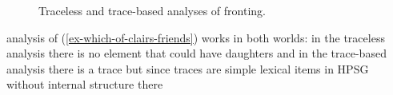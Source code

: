 \documentclass[output=paper
 	        ,biblatex
                ,babelshorthands
                ,newtxmath
                ,draftmode
                ,colorlinks, citecolor=brown
]{langscibook}
\begin{document}
\begin{figure}
\hfill
{}
\hfill
{}
\hfill{}
\caption{Traceless and trace-based analyses of fronting.}\label{fig-trace-based-and-traceless}
\end{figure}
 analysis of (\ref{ex-which-of-clairs-friends}) works in both worlds: in the
traceless analysis there is no element that could have daughters and in the trace-based analysis
there is a trace but since traces are simple lexical items in HPSG without internal structure \citep[164]{ps2} there
\end{document}
